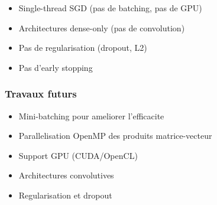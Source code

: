 \documentclass[
  letterpaper,
  DIV=11,
  numbers=noendperiod]{scrartcl}
\providecommand{\tightlist}{%
  \setlength{\itemsep}{0pt}\setlength{\parskip}{0pt}}
\begin{document}
\begin{itemize}
\tightlist
\item Single-thread SGD (pas de batching, pas de GPU)
\item Architectures dense-only (pas de convolution)
\item Pas de regularisation (dropout, L2)
\item Pas d'early stopping
\end{itemize}

\subsubsection{Travaux futurs}\label{travaux-futurs}

\begin{itemize}
\tightlist
\item Mini-batching pour ameliorer l'efficacite
\item Parallelisation OpenMP des produits matrice-vecteur
\item Support GPU (CUDA/OpenCL)
\item Architectures convolutives
\item Regularisation et dropout
\end{itemize}
\end{document}
